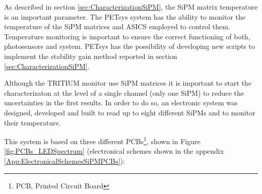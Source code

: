 As described in section \ref{sec:CharacterizationSiPM}, the SiPM matrix temperature is an important parameter. The PETsys system has the ability to monitor the temperature of the SiPM matrices and ASICS employed to control them. Temperature monitoring is important to ensure the correct functioning of both, photosensors and system. PETsys has the possibility of developing new scripts to implement the stability gain method reported in section \ref{sec:CharacterizationSiPM}.

Although the TRITIUM monitor use SiPM matrices it is important to start the characterizaton at the level of a single channel (only one SiPM) to reduce the uncertainties in the first results. In order to do so, an electronic system was designed, developed and built to read up to eight different SiPMs and to monitor their temperature.

This system is based on three different PCBs\footnote{PCB, Printed Circuit Board}, shown in Figure \ref{fig:PCBs_LEDSpectrum} (electronical schemes shown in the appendix \ref{App:ElectronicalSchemesSiPMPCBs}):

